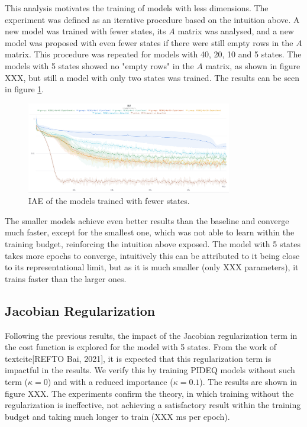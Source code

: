 This analysis motivates the training of models with less dimensions.
The experiment was defined as an iterative procedure based on the intuition above.
A new model was trained with fewer states, its $A$ matrix was analysed, and a new model was proposed with even fewer states if there were still empty rows in the $A$ matrix.
This procedure was repeated for models with 40, 20, 10 and 5 states.
The models with 5 states showed no "empty rows" in the $A$ matrix, as shown in figure XXX, but still a model with only two states was trained.  %
The results can be seen in figure \ref{fig:images-exp_2_iae-png}.

\begin{figure}[h]
    \centering
    \includegraphics[width=0.8\textwidth]{images/exp_2_iae.png}
    \caption{IAE of the models trained with fewer states.}
    \label{fig:images-exp_2_iae-png}
\end{figure}

The smaller models achieve even better results than the baseline and converge much faster, except for the smallest one, which was not able to learn within the training budget, reinforcing the intuition above exposed.
The model with 5 states takes more epochs to converge, intuitively this can be attributed to it being close to its representational limit, but as it is much smaller (only XXX parameters), it trains faster than the larger ones.  %

\subsection{Jacobian Regularization}

Following the previous results, the impact of the Jacobian regularization term in the cost function is explored for the model with 5 states.
From the work of textcite[REFTO Bai, 2021], it is expected that this regularization term is impactful in the results.
We verify this by training \gls{PIDEQ} models without such term ($\kappa=0$) and with a reduced importance ($\kappa=0.1$).
The results are shown in figure XXX.
The experiments confirm the theory, in which training without the regularization is ineffective, not achieving a satisfactory result within the training budget and taking much longer to train (XXX ms per epoch).  %

